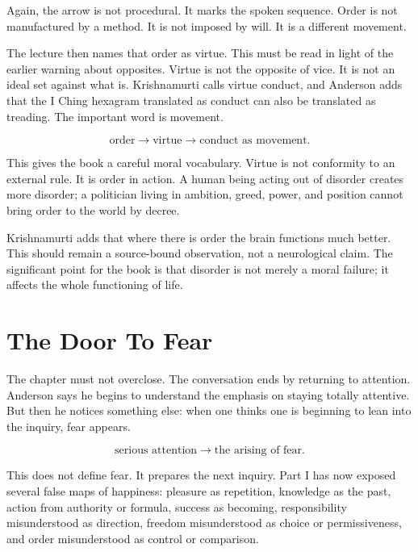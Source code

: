 \documentclass[11pt,oneside]{book}
\begin{document}
Again, the arrow is not procedural. It marks the spoken sequence. Order is not manufactured by a method. It is not imposed by will. It is a different movement.

The lecture then names that order as virtue. This must be read in light of the earlier warning about opposites. Virtue is not the opposite of vice. It is not an ideal set against what is. Krishnamurti calls virtue conduct, and Anderson adds that the I Ching hexagram translated as conduct can also be translated as treading. The important word is movement.

\begin{equation}
\text{order}
\longrightarrow
\text{virtue}
\longrightarrow
\text{conduct as movement}.
\end{equation}

This gives the book a careful moral vocabulary. Virtue is not conformity to an external rule. It is order in action. A human being acting out of disorder creates more disorder; a politician living in ambition, greed, power, and position cannot bring order to the world by decree.

Krishnamurti adds that where there is order the brain functions much better. This should remain a source-bound observation, not a neurological claim. The significant point for the book is that disorder is not merely a moral failure; it affects the whole functioning of life.

\section{The Door To Fear}

The chapter must not overclose. The conversation ends by returning to attention. Anderson says he begins to understand the emphasis on staying totally attentive. But then he notices something else: when one thinks one is beginning to lean into the inquiry, fear appears.

\begin{equation}
\text{serious attention}
\longrightarrow
\text{the arising of fear}.
\end{equation}

This does not define fear. It prepares the next inquiry. Part I has now exposed several false maps of happiness: pleasure as repetition, knowledge as the past, action from authority or formula, success as becoming, responsibility misunderstood as direction, freedom misunderstood as choice or permissiveness, and order misunderstood as control or comparison.
\end{document}
